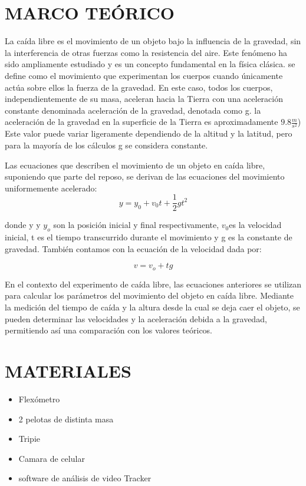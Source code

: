 \documentclass[journal]{IEEEtran}
\begin{document}
\section{MARCO TEÓRICO}
La caída libre es el movimiento de un objeto bajo la influencia de la gravedad, sin la interferencia de otras fuerzas como la resistencia del aire. Este fenómeno ha sido ampliamente estudiado y es un concepto fundamental en la física clásica.
se define como el movimiento que experimentan los cuerpos cuando únicamente actúa sobre ellos la fuerza de la gravedad. En este caso, todos los cuerpos, independientemente de su masa, aceleran hacia la Tierra con una aceleración constante denominada aceleración de la gravedad, denotada como g.
la aceleración de la gravedad en la superficie de la Tierra es aproximadamente \(9.8 \frac{m}{s^{2}}\)) Este valor puede variar ligeramente dependiendo de la altitud y la latitud, pero para la mayoría de los cálculos g se considera constante. 

Las ecuaciones que describen el movimiento de un objeto en caída libre, suponiendo que parte del reposo, se derivan de las ecuaciones del movimiento uniformemente acelerado:
\begin{equation}\label{eq:1}
 y= y_0 + v_0t + \frac{1}{2}gt^2
\end{equation}

donde y y \(y_o\) son la posición inicial y final respectivamente, \(v_0\)es la velocidad inicial, t es el tiempo transcurrido durante el movimiento y g es la constante de gravedad.
También contamos con la ecuación de la velocidad dada por:

\begin{equation}\label{eq:2}
 v=v_o + tg
\end{equation}

En el contexto del experimento de caída libre, las ecuaciones anteriores se utilizan para calcular los parámetros del movimiento del objeto en caída libre. Mediante la medición del tiempo de caída y la altura desde la cual se deja caer el objeto, se pueden determinar las velocidades y la aceleración debida a la gravedad, permitiendo así una comparación con los valores teóricos.


\section{ MATERIALES}
\begin{itemize}
\item Flexómetro \item 2 pelotas de distinta masa  
\item Tripie \item Camara de celular \item software de análisis de video Tracker
\end{itemize}
\end{document}
